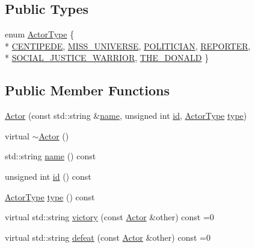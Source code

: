\subsection*{Public Types}
\begin{DoxyCompactItemize}
\item 
enum \hyperlink{classActor_a398752837eee9970ca00a3565e52c4da}{Actor\+Type} \{ \\*
\hyperlink{classActor_a398752837eee9970ca00a3565e52c4daaca4c443e9d37143364c2760158033d08}{C\+E\+N\+T\+I\+P\+E\+DE}, 
\hyperlink{classActor_a398752837eee9970ca00a3565e52c4daacf7f8a23b2a3995ab6777cb142cec6dc}{M\+I\+S\+S\+\_\+\+U\+N\+I\+V\+E\+R\+SE}, 
\hyperlink{classActor_a398752837eee9970ca00a3565e52c4daa7c3965a675a848e7e3d0c28a9218e20a}{P\+O\+L\+I\+T\+I\+C\+I\+AN}, 
\hyperlink{classActor_a398752837eee9970ca00a3565e52c4daa2911d77bb4a8255879b4684d6a84668d}{R\+E\+P\+O\+R\+T\+ER}, 
\\*
\hyperlink{classActor_a398752837eee9970ca00a3565e52c4daa6f51cf00ba9bc370ee69e35b1fb2c8aa}{S\+O\+C\+I\+A\+L\+\_\+\+J\+U\+S\+T\+I\+C\+E\+\_\+\+W\+A\+R\+R\+I\+OR}, 
\hyperlink{classActor_a398752837eee9970ca00a3565e52c4daa487ebaaccf7772d5a8bfb16b2a4c8e3c}{T\+H\+E\+\_\+\+D\+O\+N\+A\+LD}
 \}
\end{DoxyCompactItemize}
\subsection*{Public Member Functions}
\begin{DoxyCompactItemize}
\item 
\hyperlink{classActor_abe57954a691a017c6ee051d6d21baf13}{Actor} (const std\+::string \&\hyperlink{classActor_a400c24cfb4609e95e869bfe970f386c5}{name}, unsigned int \hyperlink{classActor_a084438abd4bcb9d5e17b8ad75b0f5984}{id}, \hyperlink{classActor_a398752837eee9970ca00a3565e52c4da}{Actor\+Type} \hyperlink{classActor_a2be506fc6785b49d642a1b8f445c5c00}{type})
\item 
virtual \hyperlink{classActor_ad807fe8f85e72ab263a0c05e3231cb39}{$\sim$\+Actor} ()
\item 
std\+::string \hyperlink{classActor_a400c24cfb4609e95e869bfe970f386c5}{name} () const 
\item 
unsigned int \hyperlink{classActor_a084438abd4bcb9d5e17b8ad75b0f5984}{id} () const 
\item 
\hyperlink{classActor_a398752837eee9970ca00a3565e52c4da}{Actor\+Type} \hyperlink{classActor_a2be506fc6785b49d642a1b8f445c5c00}{type} () const 
\item 
virtual std\+::string \hyperlink{classActor_a1595ffb3d753120a9e74eac0bd69adf1}{victory} (const \hyperlink{classActor}{Actor} \&other) const =0
\item 
virtual std\+::string \hyperlink{classActor_a0405c30d4ad11809647d2bf4e78026a7}{defeat} (const \hyperlink{classActor}{Actor} \&other) const =0
\end{DoxyCompactItemize}


